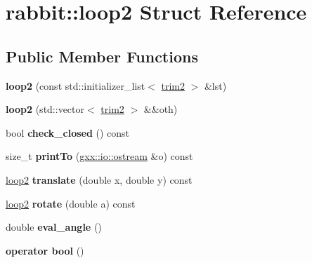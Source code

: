 \hypertarget{structrabbit_1_1loop2}{}\section{rabbit\+:\+:loop2 Struct Reference}
\label{structrabbit_1_1loop2}
\subsection*{Public Member Functions}
\begin{DoxyCompactItemize}
\item 
{\bfseries loop2} (const std\+::initializer\+\_\+list$<$ \hyperlink{structrabbit_1_1trim2}{trim2} $>$ \&lst)\hypertarget{structrabbit_1_1loop2_a471d39a51aed166c15cb46a143f78fa4}{}\label{structrabbit_1_1loop2_a471d39a51aed166c15cb46a143f78fa4}

\item 
{\bfseries loop2} (std\+::vector$<$ \hyperlink{structrabbit_1_1trim2}{trim2} $>$ \&\&oth)\hypertarget{structrabbit_1_1loop2_a60a4a3895c21fcdbba23e6300730986d}{}\label{structrabbit_1_1loop2_a60a4a3895c21fcdbba23e6300730986d}

\item 
bool {\bfseries check\+\_\+closed} () const \hypertarget{structrabbit_1_1loop2_a45448fd5bbb52d2edea4c1d94e3a7d2e}{}\label{structrabbit_1_1loop2_a45448fd5bbb52d2edea4c1d94e3a7d2e}

\item 
size\+\_\+t {\bfseries print\+To} (\hyperlink{classgxx_1_1io_1_1ostream}{gxx\+::io\+::ostream} \&o) const \hypertarget{structrabbit_1_1loop2_a251cef1bb65db1f4e59d7ff32907d9f5}{}\label{structrabbit_1_1loop2_a251cef1bb65db1f4e59d7ff32907d9f5}

\item 
\hyperlink{structrabbit_1_1loop2}{loop2} {\bfseries translate} (double x, double y) const \hypertarget{structrabbit_1_1loop2_a3537ff0a785717fce28558cc07337d34}{}\label{structrabbit_1_1loop2_a3537ff0a785717fce28558cc07337d34}

\item 
\hyperlink{structrabbit_1_1loop2}{loop2} {\bfseries rotate} (double a) const \hypertarget{structrabbit_1_1loop2_abe9d2265b3ecad57bb0ab4558e3f54cc}{}\label{structrabbit_1_1loop2_abe9d2265b3ecad57bb0ab4558e3f54cc}

\item 
double {\bfseries eval\+\_\+angle} ()\hypertarget{structrabbit_1_1loop2_a86bd8d418dc287e46237ce990cca9146}{}\label{structrabbit_1_1loop2_a86bd8d418dc287e46237ce990cca9146}

\item 
{\bfseries operator bool} ()\hypertarget{structrabbit_1_1loop2_a0e6f6d6cacd912cbc57b3fe78a3c04dd}{}\label{structrabbit_1_1loop2_a0e6f6d6cacd912cbc57b3fe78a3c04dd}

\end{DoxyCompactItemize}
